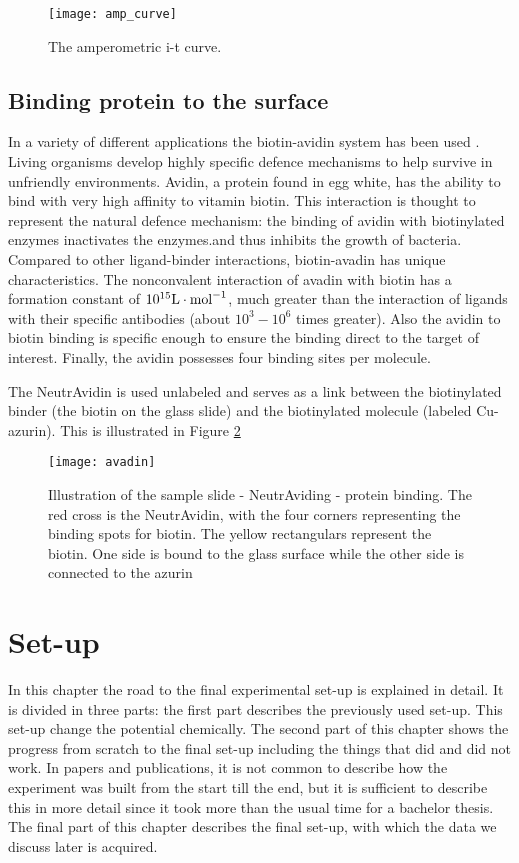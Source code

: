 \documentclass[twoside,single]{lion-msc}
\begin{document}
\begin{figure}[ht!]
\centering
\texttt{[image: amp\_curve]}
\caption{The amperometric i-t curve. } 
\label{amp_curve}
\end{figure}

\section{Binding protein to the surface}\label{neutra}
In a variety of different applications the biotin-avidin system has been used \cite{Diamandis1991}. Living organisms develop highly specific defence mechanisms to help survive in unfriendly environments. Avidin, a protein found in egg white, has the ability to bind with very high affinity to vitamin biotin. This interaction is thought to represent the natural defence mechanism: the binding of avidin with biotinylated enzymes inactivates the enzymes.and thus inhibits the growth of bacteria. Compared to other  ligand-binder interactions, biotin-avadin has unique characteristics. The nonconvalent interaction of avadin with biotin has a formation constant of $10^{15}\textup{L}\cdot \textup{mol}^{-1}$, much greater than the interaction of ligands with their specific antibodies (about $10^{3}-10^{6}$ times greater). Also the avidin to biotin binding is specific enough to ensure the binding direct to the target of interest. Finally, the avidin possesses four binding sites per molecule. 

The NeutrAvidin is used unlabeled and serves as a link between the biotinylated binder (the biotin on the glass slide) and the biotinylated molecule (labeled Cu-azurin). This is illustrated in Figure \ref{avadinbinding} 

\begin{figure}[ht!]
\centering
\texttt{[image: avadin]}
\caption{Illustration of the sample slide - NeutrAviding - protein binding. The red cross is the NeutrAvidin, with the four corners representing the binding spots for biotin. The yellow rectangulars represent the biotin. One side is bound to the glass surface while the other side is connected to the azurin}
\label{avadinbinding}
\end{figure}

\chapter{Set-up}

In this chapter the road to the final experimental set-up is explained in detail. It is divided in three parts: the first part describes the previously used set-up. This set-up change the potential chemically. The second part of this chapter shows the progress from scratch to the final set-up including the things that did and did not work. In papers and publications, it is not  common to describe how the experiment was built from the start till the end, but it is sufficient to describe this in more detail since it took more than the usual time for a bachelor thesis. The final part of this chapter describes the final set-up, with which the data we discuss later is acquired. 
\end{document}
